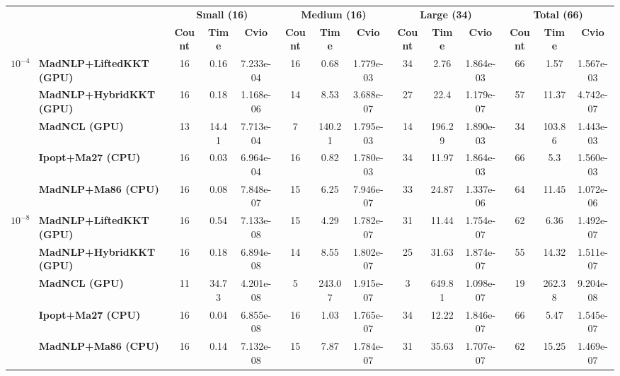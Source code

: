 \begin{center}
\renewcommand{\arraystretch}{0.9}
\begin{tabular}{|l|l|ccc|ccc|ccc|ccc|}
\hline
 & & \multicolumn{3}{c|}{\textbf{Small (16)}} & \multicolumn{3}{c|}{\textbf{Medium (16)}} & \multicolumn{3}{c|}{\textbf{Large (34)}} & \multicolumn{3}{c|}{\textbf{Total (66)}} \\
 & & \textbf{Count} & \textbf{Time} & \textbf{Cvio} & \textbf{Count} & \textbf{Time} & \textbf{Cvio} & \textbf{Count} & \textbf{Time} & \textbf{Cvio} & \textbf{Count} & \textbf{Time} & \textbf{Cvio}\\
\hline
\multirow{5}{*}{\Large\textbf{$10^{-4}$}} & \textbf{MadNLP+LiftedKKT (GPU)} & \cellcolor{blue!15}16 & 0.16 & 7.233e-04 & \cellcolor{blue!15}16 & \cellcolor{blue!15}0.68 & 1.779e-03 & \cellcolor{blue!15}34 & \cellcolor{blue!15}2.76 & 1.864e-03 & \cellcolor{blue!15}66 & \cellcolor{blue!15}1.57 & 1.567e-03 \\
 & \textbf{MadNLP+HybridKKT (GPU)} & \cellcolor{blue!15}16 & 0.18 & 1.168e-06 & 14 & 8.53 & \cellcolor{blue!15}3.688e-07 & 27 & 22.4 & \cellcolor{blue!15}1.179e-07 & 57 & 11.37 & \cellcolor{blue!15}4.742e-07 \\
 & \textbf{MadNCL (GPU)} & 13 & 14.41 & 7.713e-04 & 7 & 140.21 & 1.795e-03 & 14 & 196.29 & 1.890e-03 & 34 & 103.86 & 1.443e-03 \\
 & \textbf{Ipopt+Ma27 (CPU)} & \cellcolor{blue!15}16 & \cellcolor{blue!15}0.03 & 6.964e-04 & \cellcolor{blue!15}16 & 0.82 & 1.780e-03 & \cellcolor{blue!15}34 & 11.97 & 1.864e-03 & \cellcolor{blue!15}66 & 5.3 & 1.560e-03 \\
 & \textbf{MadNLP+Ma86 (CPU)} & \cellcolor{blue!15}16 & 0.08 & \cellcolor{blue!15}7.848e-07 & 15 & 6.25 & 7.946e-07 & 33 & 24.87 & 1.337e-06 & 64 & 11.45 & 1.072e-06 \\
\hline
\multirow{5}{*}{\Large\textbf{$10^{-8}$}} & \textbf{MadNLP+LiftedKKT (GPU)} & \cellcolor{blue!15}16 & 0.54 & 7.133e-08 & 15 & 4.29 & 1.782e-07 & 31 & \cellcolor{blue!15}11.44 & 1.754e-07 & 62 & 6.36 & 1.492e-07 \\
 & \textbf{MadNLP+HybridKKT (GPU)} & \cellcolor{blue!15}16 & 0.18 & 6.894e-08 & 14 & 8.55 & 1.802e-07 & 25 & 31.63 & 1.874e-07 & 55 & 14.32 & 1.511e-07 \\
 & \textbf{MadNCL (GPU)} & 11 & 34.73 & \cellcolor{blue!15}4.201e-08 & 5 & 243.07 & 1.915e-07 & 3 & 649.81 & \cellcolor{blue!15}1.098e-07 & 19 & 262.38 & \cellcolor{blue!15}9.204e-08 \\
 & \textbf{Ipopt+Ma27 (CPU)} & \cellcolor{blue!15}16 & \cellcolor{blue!15}0.04 & 6.855e-08 & \cellcolor{blue!15}16 & \cellcolor{blue!15}1.03 & \cellcolor{blue!15}1.765e-07 & \cellcolor{blue!15}34 & 12.22 & 1.846e-07 & \cellcolor{blue!15}66 & \cellcolor{blue!15}5.47 & 1.545e-07 \\
 & \textbf{MadNLP+Ma86 (CPU)} & \cellcolor{blue!15}16 & 0.14 & 7.132e-08 & 15 & 7.87 & 1.784e-07 & 31 & 35.63 & 1.707e-07 & 62 & 15.25 & 1.469e-07 \\
\hline
\end{tabular}
\end{center}

